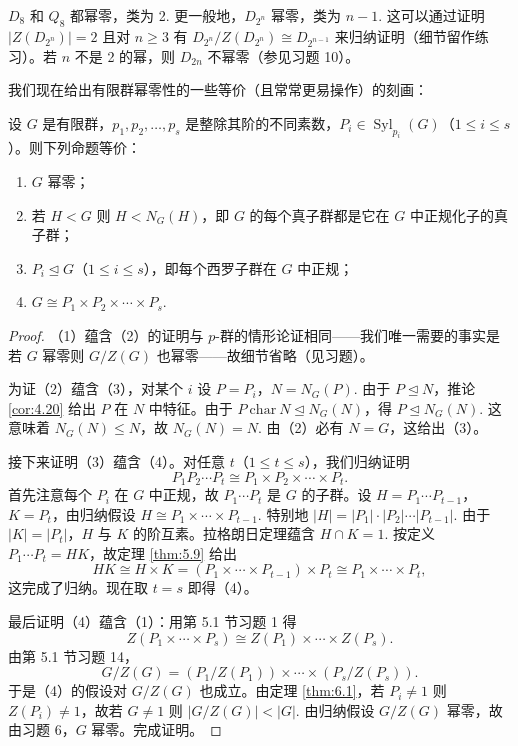 \begin{example}
\(D_8\) 和 \(Q_8\) 都幂零，类为 2. 更一般地，\(D_{2^n}\) 幂零，类为 \(n-1\). 这可以通过证明 \(|Z(D_{2^n})| = 2\) 且对 \(n \geq 3\) 有 \(D_{2^n}/Z(D_{2^n}) \cong D_{2^{n-1}}\) 来归纳证明（细节留作练习）。若 \(n\) 不是 2 的幂，则 \(D_{2n}\) 不幂零（参见习题 10）。
\end{example}

我们现在给出有限群幂零性的一些等价（且常常更易操作）的刻画：

\begin{theorem}\label{thm:6.3}
设 \(G\) 是有限群，\(p_1, p_2, \ldots, p_s\) 是整除其阶的不同素数，\(P_i \in \operatorname{Syl}_{p_i}(G)\)（\(1 \leq i \leq s\)）。则下列命题等价：

\begin{enumerate}[label=(\arabic*)]
\item \(G\) 幂零；
\item 若 \(H < G\) 则 \(H < N_G(H)\)，即 \(G\) 的每个真子群都是它在 \(G\) 中正规化子的真子群；
\item \(P_i \trianglelefteq G\)（\(1 \leq i \leq s\)），即每个西罗子群在 \(G\) 中正规；
\item \(G \cong P_1 \times P_2 \times \cdots \times P_s\).
\end{enumerate}
\end{theorem}

\begin{proof}
（1）蕴含（2）的证明与 \(p\)-群的情形论证相同——我们唯一需要的事实是若 \(G\) 幂零则 \(G/Z(G)\) 也幂零——故细节省略（见习题）。

为证（2）蕴含（3），对某个 \(i\) 设 \(P = P_i\)，\(N = N_G(P)\). 由于 \(P \trianglelefteq N\)，推论 \ref{cor:4.20} 给出 \(P\) 在 \(N\) 中特征。由于 \(P\ \mathrm{char}\ N \trianglelefteq N_G(N)\)，得 \(P \trianglelefteq N_G(N)\). 这意味着 \(N_G(N) \leq N\)，故 \(N_G(N) = N\). 由（2）必有 \(N = G\)，这给出（3）。

接下来证明（3）蕴含（4）。对任意 \(t\)（\(1 \leq t \leq s\)），我们归纳证明
\[
P_1P_2\cdots P_t \cong P_1 \times P_2 \times \cdots \times P_t.
\]
首先注意每个 \(P_i\) 在 \(G\) 中正规，故 \(P_1\cdots P_t\) 是 \(G\) 的子群。设 \(H = P_1\cdots P_{t-1}\)，\(K = P_t\)，由归纳假设 \(H \cong P_1 \times \cdots \times P_{t-1}\). 特别地 \(|H| = |P_1|\cdot|P_2|\cdots|P_{t-1}|\). 由于 \(|K| = |P_t|\)，\(H\) 与 \(K\) 的阶互素。拉格朗日定理蕴含 \(H \cap K = 1\). 按定义 \(P_1\cdots P_t = HK\)，故定理 \ref{thm:5.9} 给出
\[
HK \cong H \times K = (P_1 \times \cdots \times P_{t-1}) \times P_t \cong P_1 \times \cdots \times P_t,
\]
这完成了归纳。现在取 \(t = s\) 即得（4）。

最后证明（4）蕴含（1）：用第 5.1 节习题 1 得
\[
Z(P_1 \times \cdots \times P_s) \cong Z(P_1) \times \cdots \times Z(P_s).
\]
由第 5.1 节习题 14，
\[
G/Z(G) = (P_1/Z(P_1)) \times \cdots \times (P_s/Z(P_s)).
\]
于是（4）的假设对 \(G/Z(G)\) 也成立。由定理 \ref{thm:6.1}，若 \(P_i \neq 1\) 则 \(Z(P_i) \neq 1\)，故若 \(G \neq 1\) 则 \(|G/Z(G)| < |G|\). 由归纳假设 \(G/Z(G)\) 幂零，故由习题 6，\(G\) 幂零。完成证明。
\end{proof}

